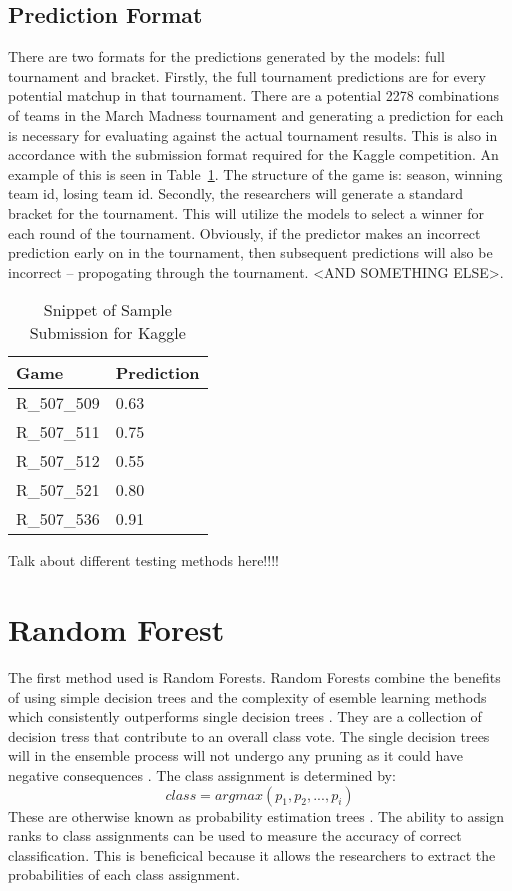 \documentclass[conference]{IEEEtran}
\begin{document}
\subsection{Prediction Format}
There are two formats for the predictions generated by the models: full tournament and bracket. Firstly, the full tournament predictions are for every potential matchup in that tournament. There are a potential 2278 combinations of teams in the March Madness tournament and generating a prediction for each is necessary for evaluating against the actual tournament results. This is also in accordance with the submission format required for the Kaggle competition. An example of this is seen in Table~\ref{tab:kaggle}. The structure of the game is: season, winning team id, losing team id. Secondly, the researchers will generate a standard bracket for the tournament. This will utilize the models to select a winner for each round of the tournament. 
Obviously, if the predictor makes an incorrect prediction early on in the tournament, then subsequent predictions will also be incorrect -- propogating through the tournament. <AND SOMETHING ELSE>.

\begin{table}[H]
\begin{centering}
    \begin{tabular}{|l|l|}
    \hline
    Game        & Prediction \\ \hline
    R\_507\_509 & 0.63       \\ 
    R\_507\_511 & 0.75       \\ 
    R\_507\_512 & 0.55       \\ 
    R\_507\_521 & 0.80       \\ 
    R\_507\_536 & 0.91       \\ \hline
    \end{tabular}
    \label{tab:kaggle}
    \caption{Snippet of Sample Submission for Kaggle}
    \end{centering}
\end{table}

Talk about different testing methods here!!!!

\section{Random Forest}
The first method used is Random Forests. Random Forests combine the benefits of using simple decision trees and the complexity of esemble learning methods which consistently outperforms single decision trees \cite{THOMASG.DIETTERICH:1999}. They are a collection of decision tress that contribute to an overall class vote. The single decision trees will in the ensemble process will not undergo any pruning as it could have negative consequences \cite{THOMASG.DIETTERICH:1999}. The class assignment is determined by:
\begin{equation}
class = argmax(p_1, p_2,...,p_i)
\end{equation}
These are otherwise known as probability estimation trees \cite{THOMASG.DIETTERICH:1999}. The ability to assign ranks to class assignments can be used to measure the accuracy of correct classification. This is beneficical because it allows the researchers to extract the probabilities of each class assignment. 
\end{document}
